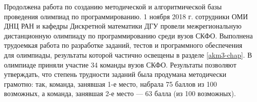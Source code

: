 Продолжена работа по созданию методической и алгоритмической базы проведения олимпиад по программированию. 
1 ноября 2018 г. сотрудники ОМИ ДНЦ РАН и кафедры Дискретной математики ДГУ провели  межрегиональную дистанционную олимпиаду по программированию среди вузов СКФО.
Выполнена трудоемкая работа по разработке заданий, тестов и программного обеспечения для олимпиады, результаты которой частично освещены в разделе \ref{akm3-chap}.
%
В олимпиаде приняли участие 34 команды вузов СКФО. Результаты позволяют утверждать, что степень трудности заданий была продумана методически грамотно: так, команда, занявшая 1-е место, набрала 75 баллов из 100 возможных, а команда, занявшая 2-е место --- 63 балла (из 100 возможных).




%
%
%
%
%
%
%
%
%
%
%
%
%
%
%
%
%
%
%
%
